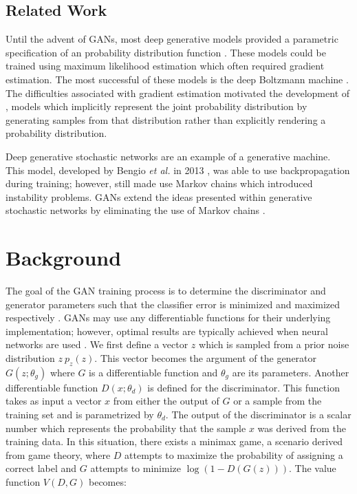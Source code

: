 \documentclass[11pt]{article}
\begin{document}
\subsection{Related Work}
Until the advent of GANs, most deep generative models provided a parametric specification of an probability distribution function \citep{2014arXiv1406.2661G}. These models could be trained using maximum likelihood estimation which often required gradient estimation. The most successful of these models is the deep Boltzmann machine \citep{2014arXiv1406.2661G}. The difficulties associated with gradient estimation motivated the development of , models which implicitly represent the joint probability distribution by generating samples from that distribution rather than explicitly rendering a probability distribution.

Deep generative stochastic networks are an example of a generative machine. This model, developed by Bengio \textit{et al.} in 2013 \citep{2013arXiv1306.1091B}, was able to use backpropagation during training; however, still made use Markov chains which introduced instability problems. GANs extend the ideas presented within generative stochastic networks by eliminating the use of Markov chains \citep{2014arXiv1406.2661G}.



\section{Background}
The goal of the GAN training process is to determine the discriminator and generator parameters such that the classifier error is minimized and maximized respectively \citep{2017arXiv171007035C}. GANs may use any differentiable functions for their underlying implementation; however, optimal results are typically achieved when neural networks are used \citep{2014arXiv1406.2661G}. We first define a vector $z$ which is sampled from a prior noise distribution $z~p_z(z)$. This vector becomes the argument of the generator $G(z;\theta_g)$ where $G$ is a differentiable function and $\theta_g$ are its parameters. Another differentiable function $D(x;\theta_d)$ is defined for the discriminator. This function takes as input a vector $x$ from either the output of $G$ or a sample from the training set and is parametrized by $\theta_d$. The output of the discriminator is a scalar number which represents the probability that the sample $x$ was derived from the training data. In this situation, there exists a minimax game, a scenario derived from game theory, where $D$ attempts to maximize the probability of assigning a correct label and $G$ attempts to minimize $\log(1-D(G(z)))$. The value function $V(D,G)$ becomes:
\end{document}
